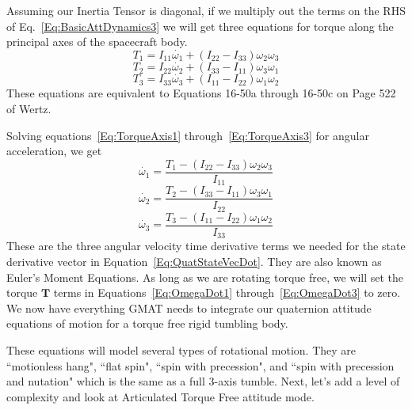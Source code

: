 %
Assuming our Inertia Tensor is diagonal, if we multiply out the terms on the RHS
of Eq.~\ref{Eq:BasicAttDynamics3} we will get three equations for torque along
the principal axes of the spacecraft body.
%
\begin{equation}
    T_1 = I_{11}\dot{\omega_1}+(I_{22}-I_{33}) \omega_2 \omega_3
    \label{Eq:TorqueAxis1}
\end{equation}
%
\begin{equation}
    T_2 = I_{22}\dot{\omega_2}+(I_{33}-I_{11}) \omega_3 \omega_1
    \label{Eq:TorqueAxis2}
\end{equation}
%
\begin{equation}
    T_3 = I_{33}\dot{\omega_3}+(I_{11}-I_{22}) \omega_1 \omega_2
    \label{Eq:TorqueAxis3}
\end{equation}
%
These equations are equivalent to Equations 16-50a through 16-50c on Page 522 of
Wertz.

Solving equations~\ref{Eq:TorqueAxis1} through~\ref{Eq:TorqueAxis3} for
angular acceleration, we get
%
\begin{equation}
    \dot{\omega_1} = \frac{T_1 - (I_{22}-I_{33}) \omega_2 \omega_3}{I_{11}}
    \label{Eq:OmegaDot1}
\end{equation}
%
\begin{equation}
    \dot{\omega_2} = \frac{T_2 - (I_{33}-I_{11}) \omega_3 \omega_1}{I_{22}}
    \label{Eq:OmegaDot2}
\end{equation}
%
\begin{equation}
    \dot{\omega_3} = \frac{T_3 - (I_{11}-I_{22}) \omega_1 \omega_2}{I_{33}}
    \label{Eq:OmegaDot3}
\end{equation}
%
These are the three angular velocity time derivative terms we needed for the
state derivative vector in Equation~\ref{Eq:QuatStateVecDot}.  They are also
known as Euler's Moment Equations.  As long as we are rotating torque free, we
will set the torque $\mathbf{T}$ terms in Equations~\ref{Eq:OmegaDot1}
through~\ref{Eq:OmegaDot3} to zero.  We now have everything GMAT needs to
integrate our quaternion attitude equations of motion for a torque free rigid
tumbling body.

These equations will model several types of rotational motion.  They are
``motionless hang", ``flat spin", ``spin with precession", and ``spin with
precession and nutation" which is the same as a full 3-axis tumble.  Next, let's
add a level of complexity and look at Articulated Torque Free attitude mode.

